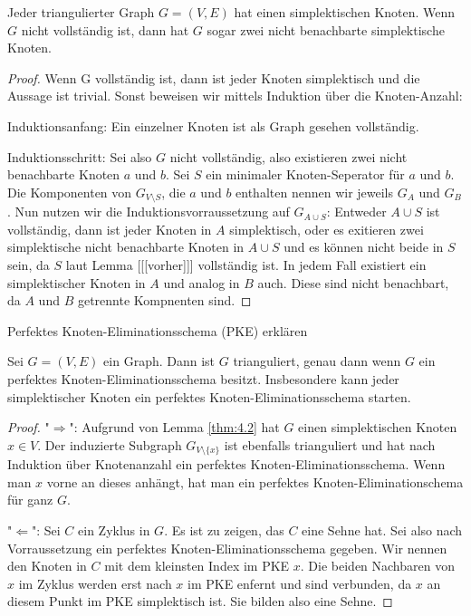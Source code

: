 \documentclass[../main.tex]{subfiles}
\begin{document}
\begin{lemma}\label{thm:4.2}
    Jeder triangulierter Graph $G = (V, E)$ hat einen simplektischen Knoten. Wenn $G$ nicht vollständig ist, dann hat $G$ sogar zwei nicht benachbarte simplektische Knoten.
\end{lemma}
\begin{proof}
    Wenn G vollständig ist, dann ist jeder Knoten simplektisch und die Aussage ist trivial. Sonst beweisen wir mittels Induktion über die Knoten-Anzahl:
    
    Induktionsanfang: Ein einzelner Knoten ist als Graph gesehen vollständig.
    
    Induktionsschritt: Sei also $G$ nicht vollständig, also existieren zwei nicht benachbarte Knoten $a$ und $b$. Sei $S$ ein minimaler Knoten-Seperator für $a$ und $b$. Die Komponenten von $G_{V \setminus S}$, die $a$ und $b$ enthalten nennen wir jeweils $G_A$ und $G_B$. Nun nutzen wir die Induktionsvorraussetzung auf $G_{A \cup S}$: Entweder $A \cup S$ ist vollständig, dann ist jeder Knoten in $A$ simplektisch, oder es exitieren zwei simplektische nicht benachbarte Knoten in $A \cup S$ und es können nicht beide in $S$ sein, da $S$ laut Lemma [[[vorher]]] vollständig ist. In jedem Fall existiert ein simplektischer Knoten in $A$ und analog in $B$ auch. Diese sind nicht benachbart, da $A$ und $B$ getrennte Kompnenten sind.
\end{proof}
    
Perfektes Knoten-Eliminationsschema (PKE) erklären

\begin{satz}
    Sei $G = (V, E)$ ein Graph. Dann ist $G$ trianguliert, genau dann wenn $G$ ein perfektes Knoten-Eliminationsschema besitzt. Insbesondere kann jeder simplektischer Knoten ein perfektes Knoten-Eliminationsschema starten.
\end{satz}
\begin{proof}
    "$\Rightarrow$": Aufgrund von Lemma \ref{thm:4.2} hat $G$ einen simplektischen Knoten $x \in V$. Der induzierte Subgraph $G_{V \setminus \{x\}}$ ist ebenfalls trianguliert und hat nach Induktion über Knotenanzahl ein perfektes Knoten-Eliminationsschema. Wenn man $x$ vorne an dieses anhängt, hat man ein perfektes Knoten-Eliminationschema für ganz $G$.
    
    "$\Leftarrow$": Sei $C$ ein Zyklus in $G$. Es ist zu zeigen, das $C$ eine Sehne hat. Sei also nach Vorraussetzung ein perfektes Knoten-Eliminationsschema gegeben. Wir nennen den Knoten in $C$ mit dem kleinsten Index im PKE $x$. Die beiden Nachbaren von $x$ im Zyklus werden erst nach $x$ im PKE enfernt und sind verbunden, da $x$ an diesem Punkt im PKE simplektisch ist. Sie bilden also eine Sehne.
\end{proof}    
    
\end{document}
